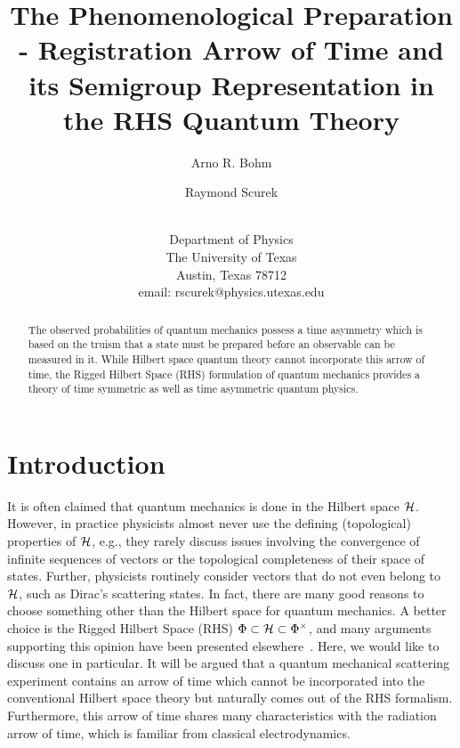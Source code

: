 \documentclass[12pt]{article}
\begin{document}
\title{The Phenomenological Preparation - Registration Arrow of Time and its Semigroup Representation in the RHS Quantum Theory}
\author{Arno R. Bohm \and Raymond Scurek \and \\
Department of Physics\\
The University of Texas \\
Austin, Texas 78712 \\
email: rscurek@physics.utexas.edu}

\maketitle

\begin{abstract}

\footnotesize

The observed probabilities of quantum mechanics possess a time asymmetry which is based on the truism that a state must be prepared before an observable can be measured in it.  While Hilbert space quantum theory cannot incorporate this arrow of time, the Rigged Hilbert Space (RHS) formulation of quantum mechanics provides a theory of time symmetric as well as time asymmetric quantum physics.

\end{abstract}



\section{Introduction}

It is often claimed that quantum mechanics is done in the Hilbert space ${\cal H}$.  However, in practice physicists almost never use the defining (topological) properties of ${\cal H}$, e.g., they rarely discuss issues involving the convergence of infinite sequences of vectors or the topological completeness of their space of states.  Further, physicists routinely consider vectors that do not even belong to ${\cal H}$, such as Dirac's scattering states.  In fact, there are many good reasons to choose something other than the Hilbert space for quantum mechanics.  A better choice is the Rigged Hilbert Space (RHS) $\Phi \subset {\cal H} \subset \Phi^{\times}$, and many arguments supporting this opinion have been presented elsewhere~\cite{RHS.arguments}.  Here, we would like to discuss one in particular.  It will be argued that a quantum mechanical scattering experiment contains an arrow of time which cannot be incorporated into the conventional Hilbert space theory but naturally comes out of the RHS formalism.  Furthermore, this arrow of time shares many characteristics with the radiation arrow of time, which is familiar from classical electrodynamics.
\end{document}
